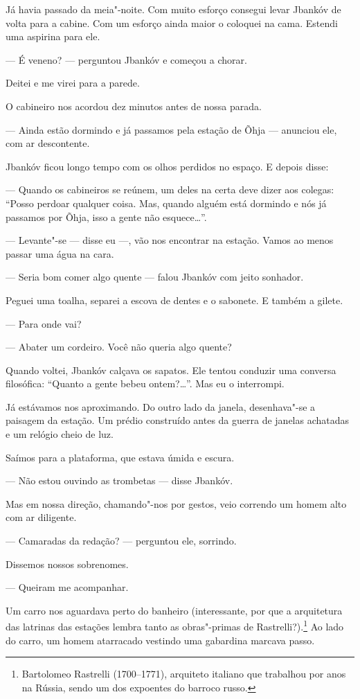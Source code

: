 Já havia passado da meia"-noite. Com muito esforço consegui levar Jbankóv
de volta para a cabine. Com um esforço ainda maior o coloquei na cama.
Estendi uma aspirina para ele.

--- É veneno? --- perguntou Jbankóv e começou a chorar.

Deitei e me virei para a parede.

O cabineiro nos acordou dez minutos antes de nossa parada.

--- Ainda estão dormindo e já passamos pela estação de Õhja
--- anunciou ele, com ar descontente.

Jbankóv ficou longo tempo com os olhos perdidos no espaço. E depois
disse:

--- Quando os cabineiros se reúnem, um deles na certa deve dizer
aos colegas: ``Posso perdoar qualquer coisa. Mas, quando alguém está
dormindo e nós já passamos por Õhja, isso a gente não esquece\ldots{}''.

--- Levante"-se --- disse eu ---, vão nos encontrar
na estação. Vamos ao menos passar uma água na cara.

--- Seria bom comer algo quente --- falou Jbankóv com
jeito sonhador.

Peguei uma toalha, separei a escova de dentes e o sabonete. E também a
gilete.

--- Para onde vai?

--- Abater um cordeiro. Você não queria algo quente?

Quando voltei, Jbankóv calçava os sapatos. Ele tentou conduzir uma
conversa filosófica: ``Quanto a gente bebeu ontem?\ldots{}''. Mas eu o
interrompi.

Já estávamos nos aproximando. Do outro lado da janela, desenhava"-se a
paisagem da estação. Um prédio construído antes da guerra de janelas
achatadas e um relógio cheio de luz.

Saímos para a plataforma, que estava úmida e escura.

--- Não estou ouvindo as trombetas --- disse Jbankóv.

Mas em nossa direção, chamando"-nos por gestos, veio correndo um homem
alto com ar diligente. 

--- Camaradas da redação? --- perguntou ele, sorrindo.

Dissemos nossos sobrenomes.

--- Queiram me acompanhar.

Um carro nos aguardava perto do banheiro (interessante, por que a
arquitetura das latrinas das estações lembra tanto as obras"-primas de
Rastrelli?).\footnote{Bartolomeo Rastrelli (1700--1771), arquiteto
  italiano que trabalhou por anos na Rússia, sendo um dos expoentes do
  barroco russo.} Ao lado do carro, um homem atarracado vestindo uma
gabardina marcava passo.


